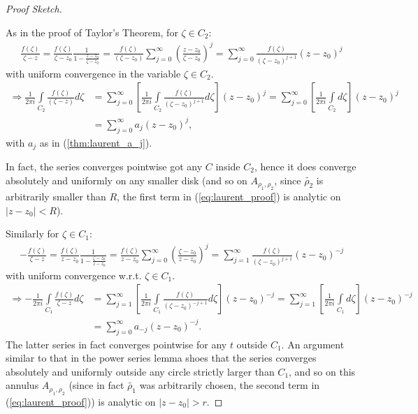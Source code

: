 \documentclass[12pt, a4paper]{article}
\theoremstyle{plain}
\theoremstyle{definition}
\begin{document}
\begin{proof}[Proof Sketch]
\begin{multicols}{2}
\begin{figure}[H]
				\end{figure}
			\end{multicols}
			As in the proof of Taylor's Theorem, for $\zeta\in C_2$:
			\begin{align*}
				\frac{f(\zeta)}{\zeta-z} = 
				\frac{f(\zeta)}{\zeta-z_0}\frac{1}{1- \frac{z-z_0}{\zeta-z_0}} = 
				\frac{f(\zeta)}{(\zeta-z_0)}\sum\limits_{j=0}^{\infty}\left(\frac{z-z_0}{\zeta-z_0}\right)^j =
				\sum\limits_{j=0}^{\infty}\frac{f(\zeta)}{(\zeta-z_0)^{j+1}}(z-z_0)^j
			\end{align*}
			with uniform convergence in the variable $\zeta\in C_2$.
			\begin{align*}
				\Rightarrow \frac{1}{2\pi i }\int\limits_{C_2}\frac{f(\zeta)}{(\zeta-z)}d \zeta &= 
				\sum\limits_{j=0}^{\infty}\left[\frac{1}{2\pi i}\int\limits_{C_2}\frac{f(\zeta)}{(\zeta-z_0)^{j+1}}d \zeta\right](z-z_0)^j =
				\sum\limits_{j=0}^{\infty}\left[\frac{1}{2\pi i}\int\limits_{C_2}d \zeta\right](z-z_0)^j\\ &=
				\sum\limits_{j=0}^{\infty}a_j(z-z_0)^j,
			\end{align*}
			with $a_j$ as in (\ref{thm:laurent_a_j}).

			In fact, the series converges pointwise got any $C$ inside $C_2$, hence it does converge absolutely and uniformly on any smaller disk (and so on $A_{\rho_1,\rho_2}$, since $\tilde{\rho_2}$ is arbitrarily smaller than $R$, the first term in (\ref{eq:laurent_proof}) is analytic on $|z-z_0|<R$).

			Similarly for $\zeta\in C_1$:
			\begin{align*}
				- \frac{f(\zeta)}{\zeta-z} =
				\frac{f(\zeta)}{z-z_0}\frac{1}{1- \frac{\zeta-z_0}{z-z_0}} = 
				\frac{f(\zeta)}{z-z_0}\sum\limits_{j=0}^{\infty}\left(\frac{\zeta-z_0}{z-z_0}\right)^j = 
				\sum\limits_{j=1}^{\infty}\frac{f(\zeta)}{(\zeta-z_0)^{j+1}}(z-z_0)^{-j}
			\end{align*}
			with uniform convergence w.r.t. $\zeta\in C_1$.
			\begin{align*}
				\Rightarrow -\frac{1}{2\pi i}\int\limits_{C_1}\frac{f(\zeta)}{\zeta - z}d \zeta &=
				\sum\limits_{j=1}^{\infty}\left[\frac{1}{2\pi i}\int\limits_{C_1}\frac{f(\zeta)}{(\zeta-z_0)^{-j+1}}d \zeta\right](z-z_0)^{-j} =
				\sum\limits_{j=1}^{\infty}\left[\frac{1}{2\pi i}\int\limits_{C_1}d \zeta\right](z-z_0)^{-j}\\ &=
				\sum\limits_{j=0}^{\infty}a_{-j}(z-z_0)^{-j}.
			\end{align*}
			The latter series in fact converges pointwise for any $t$ outside $C_1$. An argument similar to that in the power series lemma shoes that the series converges absolutely and uniformly outside any circle strictly larger than $C_1$, and so on this annulus $A_{\rho_1,\rho_2}$ (since in fact $\tilde{\rho_1}$ was arbitrarily chosen, the second term in (\ref{eq:laurent_proof})) is analytic on $|z-z_0|>r$.


\end{proof}
\end{document}
